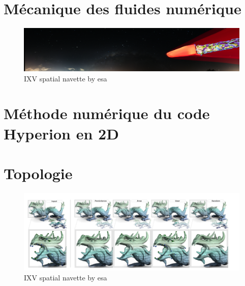 \documentclass{report}
\begin{document}
\dominitoc
\setcounter{minitocdepth}{3}
\tableofcontents


\large{

\chapter{Mécanique des fluides numérique}
\begin{figure}[!ht]
 \centering
 \includegraphics[width=1\linewidth]{chapter1_introduction/pictures/picture_chapter.png}
 \vspace{-2ex}
 \caption{IXV spatial navette by esa}
  \vspace{2ex}
 \label{chap1}
\end{figure}
\minitoc
\thispagestyle{empty}
\newpage







\chapter{Méthode numérique du code Hyperion en 2D}

\minitoc
\thispagestyle{empty}
\newpage



\chapter{Topologie}
\begin{figure}[!ht]
 \centering
 \includegraphics[width=1\linewidth]{chapter4_topology_data_analysis/pictures/picture_chapter.png}
 \vspace{-2ex}
 \caption{IXV spatial navette by esa}
  \vspace{2ex}
 \label{11}
\end{figure}
\minitoc
\thispagestyle{empty}
\newpage

}
\end{document}
